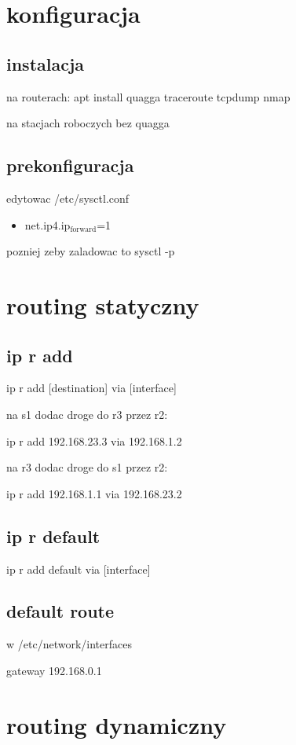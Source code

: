\documentclass[11pt]{article}
\author{Patryk Kaniewski}
\date{\today}
\title{}
\begin{document}
\tableofcontents

\section{konfiguracja}
\label{sec:org064d810}
\subsection{instalacja}
\label{sec:org19e75e1}
na routerach:
apt install quagga traceroute tcpdump nmap

na stacjach roboczych bez quagga
\subsection{prekonfiguracja}
\label{sec:orge13af27}
edytowac /etc/sysctl.conf
\begin{itemize}
\item net.ip4.ip\(_{\text{forward}}\)=1
\end{itemize}

pozniej zeby zaladowac to 
sysctl -p

\section{routing statyczny}
\label{sec:orga4a91f0}
\subsection{ip r add}
\label{sec:org3d5cb81}
ip r add [destination] via [interface]

na s1 dodac droge do r3 przez r2:

ip r add 192.168.23.3 via 192.168.1.2

na r3 dodac droge do s1 przez r2:

ip r add 192.168.1.1 via 192.168.23.2

\subsection{ip r default}
\label{sec:org4d2c397}
ip r add default via [interface]
\subsection{default route}
\label{sec:org5989eb1}
w /etc/network/interfaces

gateway 192.168.0.1
\section{routing dynamiczny}
\label{sec:org72b3581}
\end{document}
